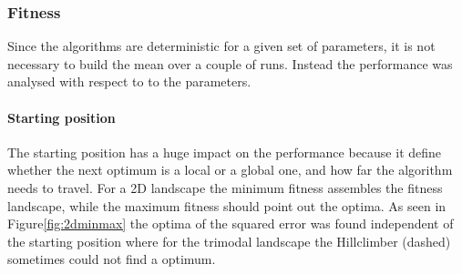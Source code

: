 \documentclass{scrartcl}
\begin{document}
\subsubsection{Fitness}
Since the algorithms are deterministic for a given set of parameters, it is not necessary to build the mean over a couple of runs. Instead the performance was analysed with respect to to the parameters.\\

\paragraph{Starting position}
The starting position has a huge impact on the performance because it define whether the next optimum is a local or a global one, and how far the algorithm needs to travel. For a 2D landscape the minimum fitness assembles the fitness landscape, while the maximum fitness should point out the optima. As seen in Figure\ref{fig:2dminmax} the optima of the squared error was found independent of the starting position where for the trimodal landscape the Hillclimber (dashed) sometimes could not find a optimum. 
\end{document}
